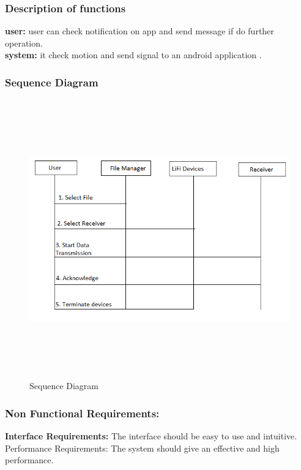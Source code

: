 \documentclass[12pt,a4paper]
{article}
\numberwithin{table}{section}
\begin{document}
{{{{{{	
\newpage
\subsubsection{Description of functions}
\textbf{user:} user can check notification on app and send message if do further operation.\\
\textbf{system: }it check motion and send signal to an android application .\\

\newpage
\subsubsection{Sequence Diagram}
\begin{center}
	  \begin{figure}[h]
			\centering
			\includegraphics[width=18 cm , height= 12cm]{S.png}
			\caption{Sequence Diagram}
		\end{figure}
	\end{center}
	
\newpage
\subsubsection{{\large Non Functional Requirements:}}
\setlength{\baselineskip}{0.85\baselineskip}
\hspace{10 pt}
\textbf{Interface Requirements:} The interface should be easy to use and intuitive. 
Performance Requirements: The system should give an effective and high performance. \\

}}}}}}
\end{document}
